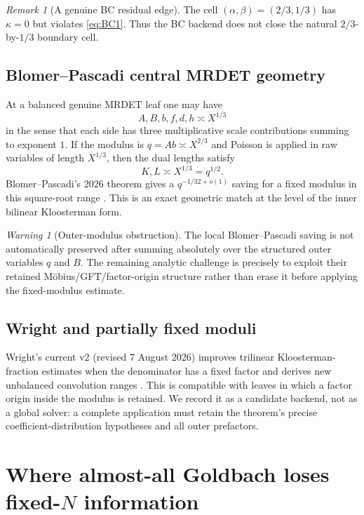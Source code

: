 \documentclass[11pt]{article}
\theoremstyle{definition}
\theoremstyle{remark}
\newtheorem{remark}[theorem]{Remark}
\newtheorem{warning}[theorem]{Warning}
\newcommand{\1}{\mathbf 1}
\begin{document}
\begin{remark}[A genuine BC residual edge]
The cell \((\alpha,\beta)=(2/3,1/3)\) has \(\kappa=0\) but violates \eqref{eq:BC1}.  Thus the BC backend does not close the natural \(2/3\)-by-\(1/3\) boundary cell.
\end{remark}

\subsection{Blomer--Pascadi central MRDET geometry}

At a balanced genuine MRDET leaf one may have
\[
 A,B,b,f,d,h\asymp X^{1/3}
\]
in the sense that each side has three multiplicative scale contributions summing to exponent \(1\).  If the modulus is \(q=Ab\asymp X^{2/3}\) and Poisson is applied in raw variables of length \(X^{1/3}\), then the dual lengths satisfy
\[
 K,L\asymp X^{1/3}=q^{1/2}.
\]
Blomer--Pascadi's 2026 theorem gives a \(q^{-1/32+o(1)}\) saving for a fixed modulus in this square-root range \cite{BP}.  This is an exact geometric match at the level of the inner bilinear Kloosterman form.

\begin{warning}[Outer-modulus obstruction]
The local Blomer--Pascadi saving is not automatically preserved after summing absolutely over the structured outer variables \(q\) and \(B\).  The remaining analytic challenge is precisely to exploit their retained M\"obius/GFT/factor-origin structure rather than erase it before applying the fixed-modulus estimate.
\end{warning}

\subsection{Wright and partially fixed moduli}

Wright's current v2 (revised 7 August 2026) improves trilinear Kloosterman-fraction estimates when the denominator has a fixed factor and derives new unbalanced convolution ranges \cite{Wright}.  This is compatible with leaves in which a factor origin inside the modulus is retained.  We record it as a candidate backend, not as a global solver: a complete application must retain the theorem's precise coefficient-distribution hypotheses and all outer prefactors.

\section{Where almost-all Goldbach loses fixed-\(N\) information}\label{sec:akeno}
\end{document}

